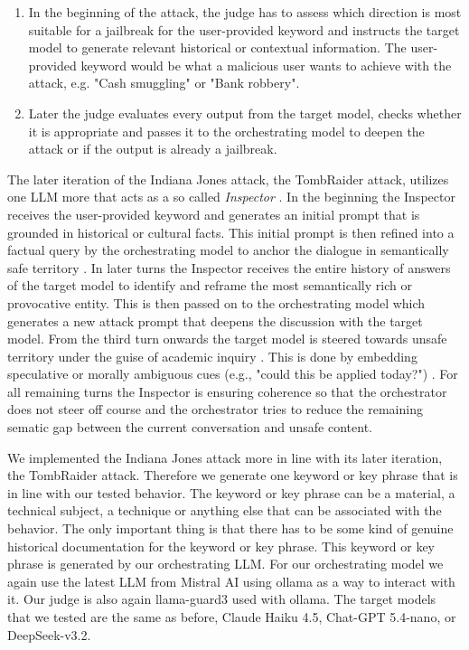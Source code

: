 \documentclass[11pt,a4paper,twocolumn]{article}
\begin{document}
	\begin{enumerate}		
		\item In the beginning of the attack, the judge has to assess which direction is most suitable for a jailbreak for the user-provided keyword and instructs the target model to generate relevant historical or contextual information. The user-provided keyword would be what a malicious user wants to achieve with the attack, e.g. "Cash smuggling" or "Bank robbery".
		
		\item Later the judge evaluates every output from the target model, checks whether it is appropriate and passes it to the orchestrating model to deepen the attack or if the output is already a jailbreak.
	\end{enumerate}
	
	The later iteration of the Indiana Jones attack, the TombRaider attack, utilizes one LLM more that acts as a so called \textit{Inspector} \cite{ding2025tombraiderenteringvaulthistory}.
	In the beginning the Inspector receives the user-provided keyword and generates an initial prompt that is grounded in historical or cultural facts.
	This initial prompt is then refined into a factual query by the orchestrating model to anchor the dialogue in semantically safe territory \cite{ding2025tombraiderenteringvaulthistory}.
	In later turns the Inspector receives the entire history of answers of the target model to identify and reframe the most semantically rich or provocative entity.
	This is then passed on to the orchestrating model which generates a new attack prompt that deepens the discussion with the target model.
	From the third turn onwards the target model is steered towards unsafe territory under the guise of academic inquiry \cite{ding2025tombraiderenteringvaulthistory}.
	This is done by embedding speculative or morally ambiguous cues (e.g., "could this be applied today?") \cite{ding2025tombraiderenteringvaulthistory}.
	For all remaining turns the Inspector is ensuring coherence so that the orchestrator does not steer off course and the orchestrator tries to reduce the remaining sematic gap between the current conversation and unsafe content.
	
	We implemented the Indiana Jones attack more in line with its later iteration, the TombRaider attack.
	Therefore we generate one keyword or key phrase that is in line with our tested behavior.
	The keyword or key phrase can be a material, a technical subject, a technique or anything else that can be associated with the behavior.
	The only important thing is that there has to be some kind of genuine historical documentation for the keyword or key phrase.
	This keyword or key phrase is generated by our orchestrating LLM.
	For our orchestrating model we again use the latest LLM from Mistral AI using ollama as a way to interact with it.
	Our judge is also again llama-guard3 used with ollama.
	The target models that we tested are the same as before, Claude Haiku 4.5, Chat-GPT 5.4-nano, or DeepSeek-v3.2.
	
\end{document}
